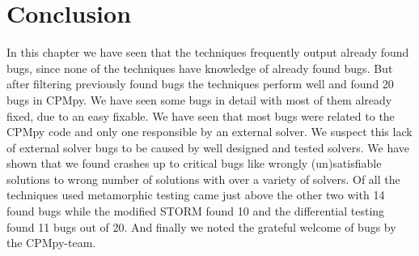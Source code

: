 

\section{Conclusion}
\label{res:conclusion}
In this chapter we have seen that the techniques frequently output already found bugs, since none of the techniques have knowledge of already found bugs. But after filtering previously found bugs the techniques perform well and found 20 bugs in CPMpy. We have seen some bugs in detail with most of them already fixed, due to an easy fixable. We have seen that most bugs were related to the CPMpy code and only one responsible by an external solver. We suspect this lack of external solver bugs to be caused by well designed and tested solvers. We have shown that we found crashes up to critical bugs like wrongly (un)satisfiable solutions to wrong number of solutions with over a variety of solvers. Of all the techniques used metamorphic testing came just above the other two with 14 found bugs while the modified STORM found 10 and the differential testing found 11 bugs out of 20. And finally we noted the grateful welcome of bugs by the CPMpy-team.

